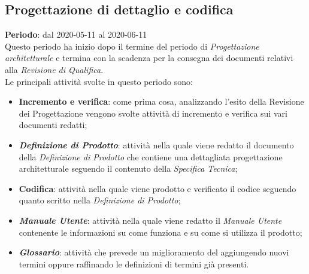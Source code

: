 \subsection{Progettazione di dettaglio e codifica}
\textbf{Periodo}: dal 2020-05-11 al 2020-06-11 \\
Questo periodo ha inizio dopo il termine del periodo di \textit{Progettazione architetturale} e termina con la scadenza per la consegna dei documenti relativi alla \textit{Revisione di Qualifica}. \\
Le principali attività svolte in questo periodo sono:
\begin{itemize}
	\item \textbf{Incremento e verifica}: come prima cosa, analizzando l'esito della Revisione dei Progettazione vengono svolte attività di incremento e verifica sui vari documenti redatti;
	\item \textbf{\textit{Definizione di Prodotto}}: attività nella quale viene redatto il documento della \textit{Definizione di Prodotto} che contiene una dettagliata progettazione architetturale seguendo il contenuto della \textit{Specifica Tecnica};
	\item \textbf{Codifica}: attività nella quale viene prodotto e verificato il codice seguendo quanto scritto nella \textit{Definizione di Prodotto};
	\item \textbf{\textit{Manuale Utente}}: attività nella quale viene redatto il \textit{Manuale Utente} contenente le informazioni su come funziona e su come si utilizza il prodotto;
	\item \textbf{\textit{Glossario}}: attività che prevede un miglioramento del \Glossario aggiungendo nuovi termini oppure raffinando le definizioni di termini già presenti.
\end{itemize}

